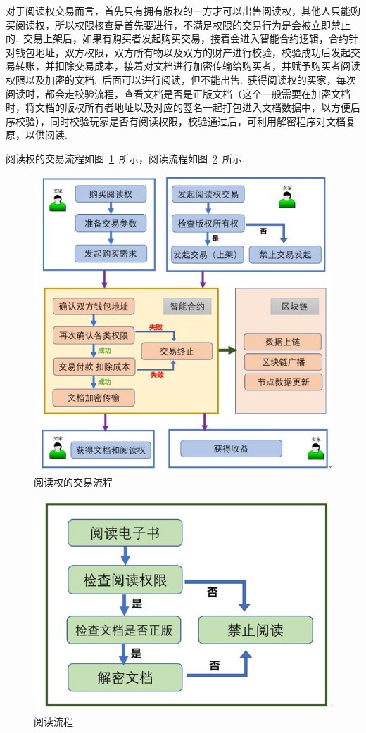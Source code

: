 \documentclass[a4paper,12pt,titlepage]{ctexart}
\begin{document}
对于阅读权交易而言，首先只有拥有版权的一方才可以出售阅读权，其他人只能购买阅读权，所以权限核查是首先要进行，不满足权限的交易行为是会被立即禁止的.~交易上架后，如果有购买者发起购买交易，接着会进入智能合约逻辑，合约针对钱包地址，双方权限，双方所有物以及双方的财产进行校验，校验成功后发起交易转账，并扣除交易成本，接着对文档进行加密传输给购买者，并赋予购买者阅读权限以及加密的文档.~后面可以进行阅读，但不能出售.~获得阅读权的买家，每次阅读时，都会走校验流程，查看文档是否是正版文档（这个一般需要在加密文档时，将文档的版权所有者地址以及对应的签名一起打包进入文档数据中，以方便后序校验），同时校验玩家是否有阅读权限，校验通过后，可利用解密程序对文档复原，以供阅读.~\par
阅读权的交易流程如图~\ref{fig17}~所示，阅读流程如图~\ref{fig18}~所示.~\par
\begin{figure}[!hbp]
	\centering
	\includegraphics[scale=0.6]{fig17.jpg}
	\caption{阅读权的交易流程}
	\label{fig17}
\end{figure}
\begin{figure}[!hbp]
	\centering
	\includegraphics[scale=0.5]{fig18.jpg}
	\caption{阅读流程}
	\label{fig18}
\end{figure}
\end{document}
